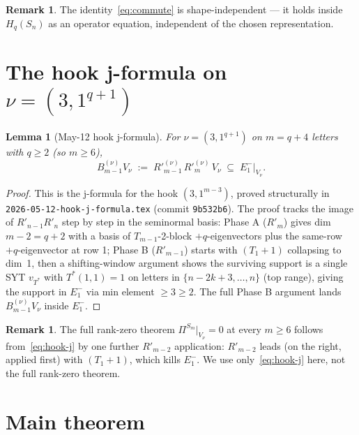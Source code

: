 \documentclass[11pt]{article}
\newtheorem{lemma}[theorem]{Lemma}
\theoremstyle{definition}
\newtheorem{remark}[theorem]{Remark}
\begin{document}
\begin{remark}
The identity~\eqref{eq:commute} is shape-independent — it holds inside
$H_q(S_n)$ as an operator equation, independent of the chosen
representation.
\end{remark}

\section{The hook j-formula on $\nu = (3, 1^{q+1})$}\label{sec:hook}

\begin{lemma}[May-12 hook j-formula]\label{lem:hook-j}
For $\nu = (3, 1^{q+1})$ on $m = q+4$ letters with $q \ge 2$
(so $m \ge 6$),
\begin{equation}\label{eq:hook-j}
   B^{(\nu)}_{m-1} V_\nu \;:=\; R'^{(\nu)}_{m-1}\, R'^{(\nu)}_m\, V_\nu
   \;\subseteq\; E_1^-|_{V_\nu}.
\end{equation}
\end{lemma}

\begin{proof}
This is the j-formula for the hook $(3, 1^{m-3})$, proved
structurally in \texttt{2026-05-12-hook-j-formula.tex} (commit
\texttt{9b532b6}). The proof tracks the image of $R'_{n-1} R'_n$
step by step in the seminormal basis: Phase A ($R'_m$) gives
dim $m - 2 = q + 2$ with a basis of $T_{m-1}$-2-block
$+q$-eigenvectors plus the same-row $+q$-eigenvector at row 1;
Phase B ($R'_{m-1}$) starts with $(T_1+1)$ collapsing to dim~1,
then a shifting-window argument shows the surviving support is
a single SYT $v_{T^*}$ with $T^*(1, 1) = 1$ on letters in
$\{n-2k+3, \ldots, n\}$ (top range), giving the support in
$E_1^-$ via min element $\ge 3 \ge 2$. The full Phase B argument
lands $B^{(\nu)}_{m-1} V_\nu$ inside $E_1^-$.
\end{proof}

\begin{remark}
The full rank-zero theorem $\Pi^{S_m}|_{V_\nu} = 0$ at every $m \ge 6$
follows from~\eqref{eq:hook-j} by one further $R'_{m-2}$
application: $R'_{m-2}$ leads (on the right, applied first) with
$(T_1+1)$, which kills $E_1^-$. We use only~\eqref{eq:hook-j}
here, not the full rank-zero theorem.
\end{remark}

\section{Main theorem}\label{sec:main}
\end{document}
